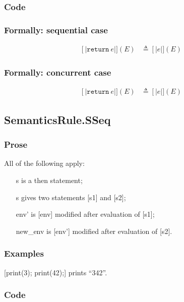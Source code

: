 \documentclass{book}
\newcommand\syntt[1]{\mathtt{#1}}
\newcommand\llbracket{[|}
\newcommand\rrbracket{|]}
\newcommand\interp[1]{\left\llbracket #1 \right\rrbracket}
\begin{document}
  \subsubsection{Code}

  \subsubsection{Formally: sequential case}
  \begin{align}
  \interp{\syntt{return}\ e} (E) & \triangleq \interp{e} (E)
  \label{eq:sem-det-sreturn}
  \end{align} 

  \subsubsection{Formally: concurrent case}
  \begin{align}
  \interp{\syntt{return}\ e} (E) & \triangleq \interp{e} (E)
  \label{eq:sem-ndet-sreturn}
  \end{align} 

\subsection{SemanticsRule.SSeq \label{sec:SemanticsRule.SSeq}}

  \subsubsection{Prose}
  All of the following apply:
  \begin{itemize}
  \item [s] is a then statement;
  \item [s] gives two statements [s1] and [s2];
  \item [env'] is [env] modified after evaluation of [s1];
  \item [new\_env] is [env'] modified after evaluation of [s2].
  \end{itemize}

  \subsubsection{Examples}
  [print(3); print(42);] prints ``342''.

  \subsubsection{Code}
\end{document}
